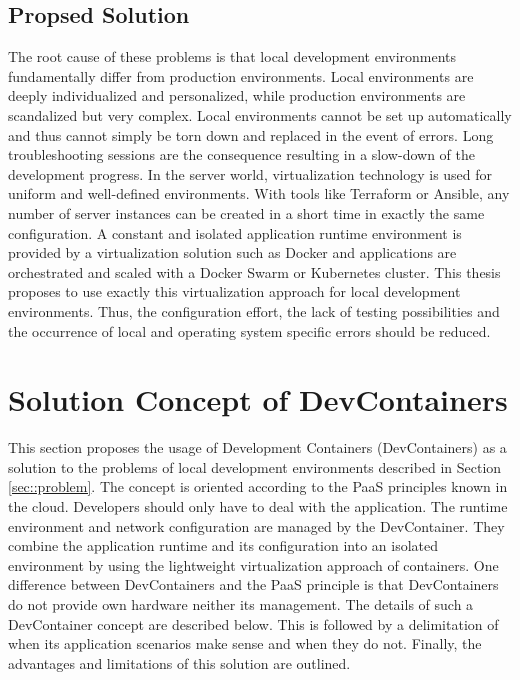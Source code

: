 \documentclass[12pt, a4paper]{article}
\begin{document}
        \subsection{Propsed Solution}
        The root cause of these problems is that local development environments fundamentally differ from production environments. Local environments are deeply individualized and personalized, while production environments are scandalized but very complex. Local environments cannot be set up automatically and thus cannot simply be torn down and replaced in the event of errors. Long troubleshooting sessions are the consequence resulting in a slow-down of the development progress.\newline
        In the server world, virtualization technology is used for uniform and well-defined environments. With tools like Terraform or Ansible, any number of server instances can be created in a short time in exactly the same configuration. A constant and isolated application runtime environment is provided by a virtualization solution such as Docker and applications are orchestrated and scaled with a Docker Swarm or Kubernetes cluster.\newline
        This thesis proposes to use exactly this virtualization approach for local development environments. Thus, the configuration effort, the lack of testing possibilities and the occurrence of local and operating system specific errors should be reduced.

\section{Solution Concept of DevContainers}\label{sec::solution_concept}
This section proposes the usage of Development Containers (DevContainers) as a solution to the problems of local development environments described in Section \ref{sec::problem}. The concept is oriented according to the \ac{PaaS} principles known in the cloud. Developers should only have to deal with the application. The runtime environment and network configuration are managed by the DevContainer. They combine the application runtime and its configuration into an isolated environment by using the lightweight virtualization approach of containers. One difference between DevContainers and the \ac{PaaS} principle is that DevContainers do not provide own hardware neither its management. \newline
The details of such a DevContainer concept are described below. This is followed by a delimitation of when its application scenarios make sense and when they do not. Finally, the advantages and limitations of this solution are outlined.
\end{document}

